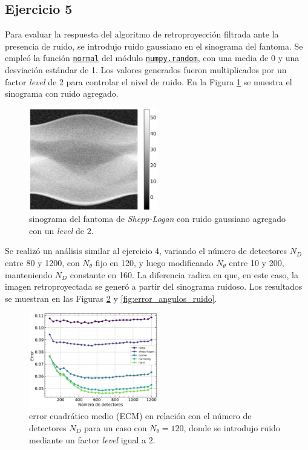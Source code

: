 \documentclass[11pt, twocolumn]{article}
\begin{document}
\subsection*{Ejercicio 5}
Para evaluar la respuesta del algoritmo de retroproyección filtrada ante la presencia de ruido, se introdujo ruido gaussiano en el sinograma del fantoma. Se empleó la función \href{https://numpy.org/doc/stable/reference/random/generated/numpy.random.normal.html}{\texttt{normal}} del módulo \href{https://numpy.org/doc/stable/reference/random/index.html}{\texttt{numpy.random}}, con una media de 0 y una desviación estándar de 1. Los valores generados fueron multiplicados por un factor \textit{level} de 2 para controlar el nivel de ruido. En la Figura \ref{fig:sinograma_ruido} se muestra el sinograma con ruido agregado.

\begin{figure} [htbp]
    \centering
    \includegraphics[width=0.5\textwidth]{images/ej_5/sinogram_noisy.png}
    \caption{sinograma del fantoma de \textit{Shepp-Logan} con ruido gaussiano agregado con un \textit{level} de $2$.}
    \label{fig:sinograma_ruido}
\end{figure}

Se realizó un análisis similar al ejercicio 4, variando el número de detectores $N_D$ entre 80 y 1200, con $N_\theta$ fijo en 120, y luego modificando $N_\theta$ entre 10 y 200, manteniendo $N_D$ constante en 160. La diferencia radica en que, en este caso, la imagen retroproyectada se generó a partir del sinograma ruidoso. Los resultados se muestran en las Figuras \ref{fig:error_escalas_ruido} y \ref{fig:error_angulos_ruido}.

\begin{figure} [htbp]
    \centering
    \includegraphics*[width=0.5\textwidth]{./images/ej_5/scale_error_noisy.png}
    \caption{error cuadrático medio (ECM) en relación con el número de detectores $N_D$ para un caso con $N_\theta = 120$, donde se introdujo ruido mediante un factor \textit{level} igual a $2$.}
    \label{fig:error_escalas_ruido}
\end{figure}
\end{document}
